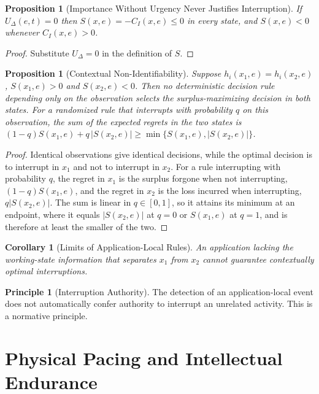 \documentclass[11pt,letterpaper]{report}
\theoremstyle{plain}
\newtheorem{proposition}[theorem]{Proposition}
\newtheorem{corollary}[theorem]{Corollary}
\theoremstyle{definition}
\newtheorem{principle}[theorem]{Principle}
\theoremstyle{remark}
\begin{document}
\begin{proposition}[Importance Without Urgency Never Justifies Interruption]\label{pr:noimpurg}
If $U_\Delta(e,t)=0$ then $S(x,e)=-C_I(x,e)\le0$ in every state, and $S(x,e)<0$ whenever $C_I(x,e)>0$.
\end{proposition}
\begin{proof}
Substitute $U_\Delta=0$ in the definition of $S$.
\end{proof}

\begin{proposition}[Contextual Non-Identifiability]\label{pr:contextnonident}
Suppose $h_i(x_1,e)=h_i(x_2,e)$, $S(x_1,e)>0$ and $S(x_2,e)<0$. Then no deterministic decision rule depending only on the observation selects the surplus-maximizing decision in both states. For a randomized rule that interrupts with probability $q$ on this observation, the sum of the expected regrets in the two states is $(1-q)S(x_1,e)+q\,|S(x_2,e)|\ge\min\{S(x_1,e),|S(x_2,e)|\}$.
\end{proposition}
\begin{proof}
Identical observations give identical decisions, while the optimal decision is to interrupt in $x_1$ and not to interrupt in $x_2$. For a rule interrupting with probability $q$, the regret in $x_1$ is the surplus forgone when not interrupting, $(1-q)S(x_1,e)$, and the regret in $x_2$ is the loss incurred when interrupting, $q|S(x_2,e)|$. The sum is linear in $q\in[0,1]$, so it attains its minimum at an endpoint, where it equals $|S(x_2,e)|$ at $q=0$ or $S(x_1,e)$ at $q=1$, and is therefore at least the smaller of the two.
\end{proof}

\begin{corollary}[Limits of Application-Local Rules]\label{co:locallimits}
An application lacking the working-state information that separates $x_1$ from $x_2$ cannot guarantee contextually optimal interruptions.
\end{corollary}

\begin{principle}[Interruption Authority]\label{pr:interruptauth}
The detection of an application-local event does not automatically confer authority to interrupt an unrelated activity. This is a normative principle.
\end{principle}

\chapter{Physical Pacing and Intellectual Endurance}
\end{document}
